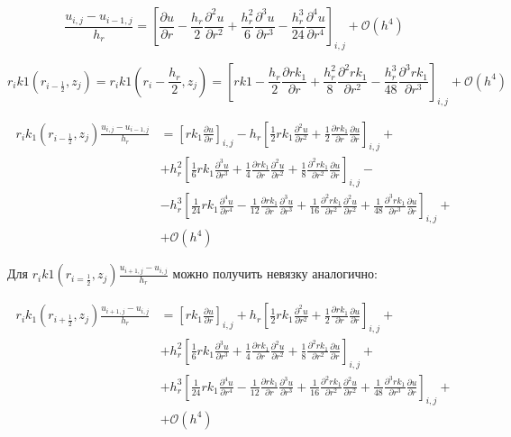 \[
  \frac{u_{i,j} - u_{i - 1, j}}{h_r} = 
  \left[
    \frac{\partial u}{\partial r} - \frac{h_r}{2}\frac{\partial^2 u}{\partial r^2}
    + \frac{h^2_r}{6}\frac{\partial^3 u}{\partial r^3} - \frac{h^3_r}{24}\frac{\partial^4 u}{\partial r^4}
  \right]_{i,j}
  + \mathcal{O}(h^4)
\]

\[
  r_i k1 (r_{i - \frac{1}{2}}, z_j) = r_i k1(r_i - \frac{h_r}{2}, z_j) =
  \left[
  r k1 - \frac{h_r}{2}\frac{\partial rk_1}{\partial r}
  + \frac{h^2_r}{8}\frac{\partial^2 rk_1}{\partial r^2}
  - \frac{h^3_r}{48}\frac{\partial^3 rk_1}{\partial r^3}
  \right]_{i,j} + \mathcal{O}(h^4)
\]

\begin{align*}
  r_i k_1 (r_{i - \frac{1}{2}}, z_j) \frac{u_{i,j} - u_{i - 1, j}}{h_r} &= 
  \left[ rk_1 \frac{\partial u}{\partial r} \right]_{i, j} -
  h_r \left[ \frac{1}{2} rk_1 \frac{\partial^2 u}{\partial r^2} 
    + \frac{1}{2} \frac{\partial rk_1}{\partial r}\frac{\partial u}{\partial r}
  \right]_{i, j} +\\
  &+ h_r^2 \left[\frac{1}{6}rk_1\frac{\partial^3 u}{\partial r^3}
  + \frac{1}{4} \frac{\partial rk_1}{\partial r}\frac{\partial^2 u}{\partial r^2}
  + \frac{1}{8} \frac{\partial^2 rk_1}{\partial r^2}\frac{\partial u}{\partial r}
  \right]_{i, j} - \\
  &-h^3_r \left[
  \frac{1}{24} r k_1 \frac{\partial^4 u}{\partial r^4} - \frac{1}{12}\frac{\partial rk_1}{\partial r}\frac{\partial^3 u}{\partial r^3}
  + \frac{1}{16} \frac{\partial^2 rk_1}{\partial r^2}\frac{\partial^2 u}{\partial r^2}
  + \frac{1}{48} \frac{\partial^3 rk_1}{\partial r^3}\frac{\partial u}{\partial r}
  \right]_{i,j} +\\
  &+ \mathcal{O}(h^4)
\end{align*}

Для $ r_i k1(r_{i = \frac{1}{2}}, z_j) \frac{u_{i + 1, j} - u_{i, j}}{h_r} $ можно получить невязку аналогично:

\begin{align*}
  r_i k_1(r_{i + \frac{1}{2}}, z_j) \frac{u_{i + 1, j} - u_{i, j}}{h_r} &= 
  \left[ rk_1 \frac{\partial u}{\partial r} \right]_{i, j} +
  h_r \left[ \frac{1}{2} rk_1 \frac{\partial^2 u}{\partial r^2} 
    + \frac{1}{2} \frac{\partial rk_1}{\partial r}\frac{\partial u}{\partial r}
  \right]_{i, j} +\\
  &+ h_r^2 \left[\frac{1}{6}rk_1\frac{\partial^3 u}{\partial r^3}
  + \frac{1}{4} \frac{\partial rk_1}{\partial r}\frac{\partial^2 u}{\partial r^2}
  + \frac{1}{8} \frac{\partial^2 rk_1}{\partial r^2}\frac{\partial u}{\partial r}
  \right]_{i, j} + \\
  &+ h^3_r \left[
  \frac{1}{24} r k_1 \frac{\partial^4 u}{\partial r^4} - \frac{1}{12}\frac{\partial rk_1}{\partial r}\frac{\partial^3 u}{\partial r^3}
  + \frac{1}{16} \frac{\partial^2 rk_1}{\partial r^2}\frac{\partial^2 u}{\partial r^2}
  + \frac{1}{48} \frac{\partial^3 rk_1}{\partial r^3}\frac{\partial u}{\partial r}
  \right]_{i,j} +\\
  &+ \mathcal{O}(h^4)
\end{align*}

